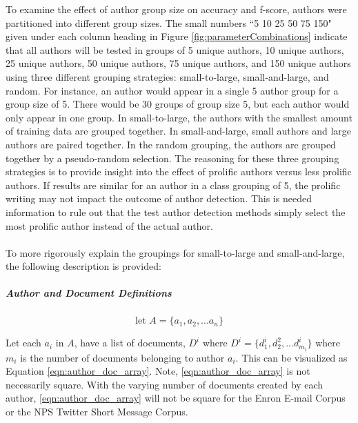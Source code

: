 To examine the effect of author group size on accuracy and f-score, authors were partitioned into different group sizes.  The small numbers ``5 10 25 50 75 150" given under each column heading in Figure \ref{fig:parameterCombinations} indicate that all authors will be tested in groups of 5 unique authors, 10 unique authors, 25 unique authors, 50 unique authors, 75 unique authors, and 150 unique authors using three different grouping strategies: small-to-large, small-and-large, and random. For instance, an author would appear in a single 5 author group for a group size of 5.  There would be 30 groups of group size 5, but each author would only appear in one group. In small-to-large, the authors with the smallest amount of training data are grouped together.  In small-and-large, small authors and large authors are paired together.  In the random grouping, the authors are grouped together by a pseudo-random selection.  The reasoning for these three grouping strategies is to provide insight into the effect of prolific authors versus less prolific authors.  If results are similar for an author in a class grouping of 5, the prolific writing may not impact the outcome of author detection. This is needed information to rule out that the test author detection methods simply select the most prolific author instead of the actual author.

\paragraph*{} To more rigorously explain the groupings for small-to-large and small-and-large, the following description is provided:
	
	\subparagraph*{Author and Document Definitions}
	\begin{equation} \text{let } A = \{ a_1, a_2, ... a_n \} \end{equation}%
	
	Let each $a_i$ in $A$, have a list of documents, $D^i$ where $D^i = \{ d_1^i, d_2^2, ... d_{m_i}^i \}$ where $m_i$ is the number of documents belonging to author $a_i$.  This can be visualized as Equation \eqref{eqn:author_doc_array}.  Note, \eqref{eqn:author_doc_array} is not necessarily square.  With the varying number of documents created by each author, \eqref{eqn:author_doc_array} will not be square for the Enron E-mail Corpus or the NPS Twitter Short Message Corpus.
	
